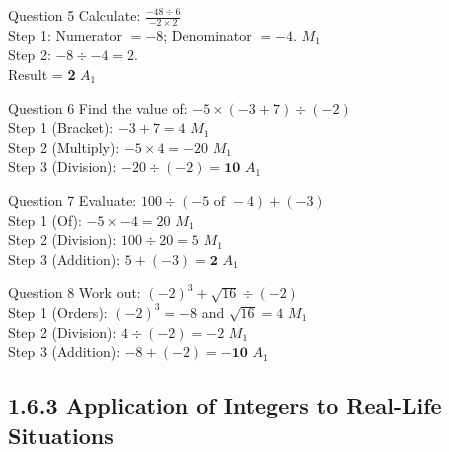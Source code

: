 \documentclass[12pt, a4paper, oneside]{article}
\begin{document}
\begin{solvingbox}{Question 5}
Calculate: $\frac{-48 \div 6}{-2 \times 2}$ \\
Step 1: Numerator $= -8$; Denominator $= -4$. \hfill $M_1$ \\
Step 2: $-8 \div -4 = 2$. \\
Result = \textbf{2} \hfill $A_1$
\end{solvingbox}
\begin{solvingbox}{Question 6}
Find the value of: $-5 \times (-3 + 7) \div (-2)$ \\
Step 1 (Bracket): $-3 + 7 = 4$ \hfill $M_1$ \\
Step 2 (Multiply): $-5 \times 4 = -20$ \hfill $M_1$ \\
Step 3 (Division): $-20 \div (-2) = \mathbf{10}$ \hfill $A_1$
\end{solvingbox}

\begin{solvingbox}{Question 7}
Evaluate: $100 \div (-5 \text{ of } -4) + (-3)$ \\
Step 1 (Of): $-5 \times -4 = 20$ \hfill $M_1$ \\
Step 2 (Division): $100 \div 20 = 5$ \hfill $M_1$ \\
Step 3 (Addition): $5 + (-3) = \mathbf{2}$ \hfill $A_1$
\end{solvingbox}

\begin{solvingbox}{Question 8}
Work out: $(-2)^3 + \sqrt{16} \div (-2)$ \\
Step 1 (Orders): $(-2)^3 = -8$ and $\sqrt{16} = 4$ \hfill $M_1$ \\
Step 2 (Division): $4 \div (-2) = -2$ \hfill $M_1$ \\
Step 3 (Addition): $-8 + (-2) = \mathbf{-10}$ \hfill $A_1$
\end{solvingbox}

\subsection*{1.6.3 Application of Integers to Real-Life Situations}
\end{document}
